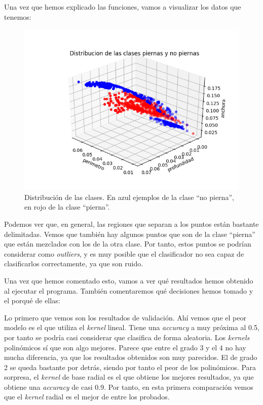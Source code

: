 \documentclass[11pt,a4paper]{article}
\begin{document}
Una vez que hemos explicado las funciones, vamos a visualizar los datos que tenemos:

\begin{figure}[H]
\centering
\includegraphics[scale=0.7]{img/plot3d-muchos-puntos}
\caption{Distribución de las clases. En azul ejemplos de la clase ``no pierna'', en rojo de la clase ``pierna''.}
\label{fig:3d}
\end{figure}

Podemos ver que, en general, las regiones que separan a los puntos están bastante
delimitadas. Vemos que también hay algunos puntos que son de la clase ``pierna''
que están mezclados con los de la otra clase. Por tanto, estos puntos se podrían
considerar como \textit{outliers}, y es muy posible que el clasificador no sea
capaz de clasificarlos correctamente, ya que son ruido.

Una vez que hemos comentado esto, vamos a ver qué resultados hemos obtenido al ejecutar
el programa. También comentaremos qué decisiones hemos tomado y el porqué de ellas:

\begin{scriptsize}

\end{scriptsize}

Lo primero que vemos son los resultados de validación. Ahí vemos que el
peor modelo es el que utiliza el \textit{kernel} lineal. Tiene una \textit{accuracy}
a muy próxima al 0.5, por tanto se podría casi considerar que clasifica de forma aleatoria.
Los \textit{kernels} polinómicos sí que son algo mejores. Parece que entre el grado 3 y
el 4 no hay mucha diferencia, ya que los resultados obtenidos son muy parecidos. El de
grado 2 se queda bastante por detrás, siendo por tanto el peor de los polinómicos.
Para sorpresa, el \textit{kernel} de base radial es el que obtiene los mejores
resultados, ya que obtiene una \textit{accuracy} de casi 0.9. Por tanto, en esta
primera comparación vemos que el \textit{kernel} radial es el mejor de entre los
probados.
\end{document}
